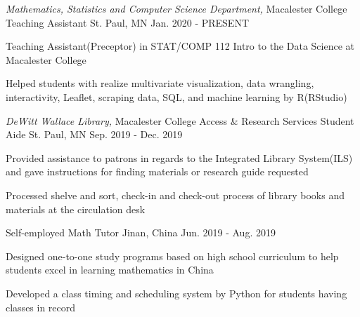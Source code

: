 

\begin{cventries}

  \cventry
    {\textit{Mathematics, Statistics and Computer Science Department,} Macalester College} %
    {Teaching Assistant} %
    {St. Paul, MN} %
    {Jan. 2020 - PRESENT} %
    {
      \begin{cvitems} %
        \item {Teaching Assistant(Preceptor) in STAT/COMP 112 Intro to the Data Science at Macalester College}
        \item {Helped students with realize multivariate visualization, data wrangling, interactivity, Leaflet, scraping data, SQL, and machine learning by R(RStudio)}
      \end{cvitems}
    }

  \cventry
    {\textit{DeWitt Wallace Library,} Macalester College} %
    {Access \& Research Services Student Aide} %
    {St. Paul, MN} %
    {Sep. 2019 - Dec. 2019} %
    {
      \begin{cvitems} %
        \item {Provided assistance to patrons in regards to the Integrated Library System(ILS) and gave instructions for finding materials or research guide requested}
        \item {Processed shelve and sort, check-in and check-out process of library books and materials at the circulation desk}
      \end{cvitems}
    }

   \cventry
    {Self-employed} %
    {Math Tutor} %
    {Jinan, China} %
    {Jun. 2019 - Aug. 2019} %
    {
      \begin{cvitems} %
        \item {Designed one-to-one study programs based on high school curriculum to help students excel in learning mathematics in China}
        \item {Developed a class timing and scheduling system by Python for students having classes in record}
      \end{cvitems}
    }
    

\end{cventries}
